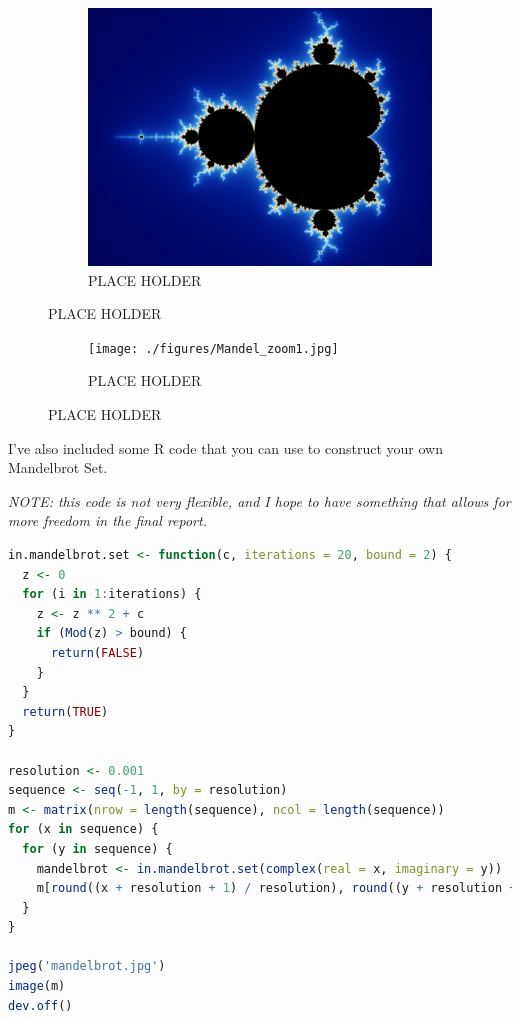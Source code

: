 \documentclass[20pt]{article} %
\begin{document}
\begin{figure}[!htbp]
  	\centering
   	\begin{subfigure}[p]{0.6\linewidth}
    	\includegraphics[width=\linewidth]{./figures/Mandel_zoom.jpg}
	\caption{PLACE HOLDER}
   	\end{subfigure}
\end{figure}

\begin{figure}[!htbp]
  	\centering
   	\begin{subfigure}[]{0.6\linewidth}
    	\texttt{[image: ./figures/Mandel\_zoom1.jpg]}
	\caption{PLACE HOLDER}
   	\end{subfigure}
\end{figure}
\newpage

I've also included some R code that you can use to construct your own Mandelbrot Set.  

\textit{NOTE: this code is not very flexible, and I hope to have something that allows for more freedom in the final report.}

\begin{lstlisting}[language=R]
in.mandelbrot.set <- function(c, iterations = 20, bound = 2) {
  z <- 0
  for (i in 1:iterations) {
    z <- z ** 2 + c
    if (Mod(z) > bound) {
      return(FALSE)
    }
  }
  return(TRUE)
}

resolution <- 0.001
sequence <- seq(-1, 1, by = resolution)
m <- matrix(nrow = length(sequence), ncol = length(sequence))
for (x in sequence) {
  for (y in sequence) {
    mandelbrot <- in.mandelbrot.set(complex(real = x, imaginary = y))
    m[round((x + resolution + 1) / resolution), round((y + resolution + 1) / resolution)] <- mandelbrot
  }
}

jpeg('mandelbrot.jpg')
image(m)
dev.off()
\end{lstlisting}
\end{document}
